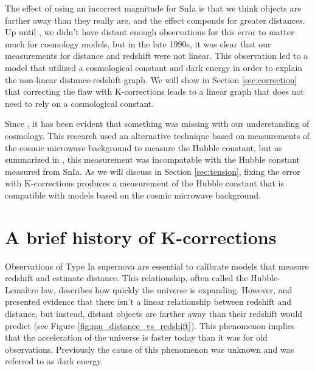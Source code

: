 \documentclass{article}
\begin{document}
The effect of using an incorrect magnitude for SnIa is that we think objects
are farther away than they really are, and the effect componds for greater
distances. Up until \citet{riess1998}, we didn't have distant enough
observations for this error to matter much for cosmology models, but in the
late 1990s, it was clear that our measurements for distance and redshift were
not linear. This observation led to a model that utilized a cosmological
constant and dark energy in order to explain the non-linear distance-redshift
graph. We will show in Section \ref{sec:correction} that correcting the flaw
with K-corrections leads to a linear graph that does not need to rely on a
cosmological constant.

Since \citet{planck2020}, it has been evident that something was missing with
our understanding of cosmology. This research used an alternative technique
based on measurements of the cosmic microwave background to measure the Hubble
constant, but as summarized in \citet{perivolaropoulos2022}, this measurement
was incompatable with the Hubble constant measured from SnIa. As we will
discuss in Section \ref{sec:tension}, fixing the error with K-corrections
produces a measurement of the Hubble constant that is compatible with models
based on the cosmic microwave background.

\section{A brief history of K-corrections}
\label{sec:history}

Observations of Type Ia supernova are essential to calibrate models that
measure redshift and estimate distance. This relationship, often called the
Hubble-Lema\^{i}tre law, describes how quickly the universe is expanding.
However, \citet{riess1998} and \citet{perlmutter1999} presented evidence that
there isn't a linear relationship between redshift and distance, but instead,
distant objects are farther away than their redshift would predict (see Figure
\ref{fig:mu_distance_vs_redshift}). This phenomenon implies that the
acceleration of the universe is faster today than it was for old observations.
Previously the cause of this phenomenon was unknown and was referred to as
dark energy.
\end{document}
